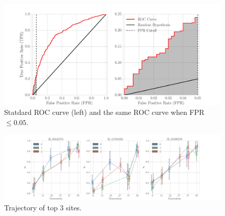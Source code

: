 \documentclass[11pt]{article}
\begin{document}
\begin{figure}[H]
	\centering
	\includegraphics[trim=0.4in 0 .8in 0.02in , 
	clip,width=\textwidth]{figures/powerROC.pdf}
	\caption{Statdard ROC curve (left) and the same ROC curve when FPR$\le 
		0.05$.} \label{fig:powerROC}
\end{figure}
\begin{figure}[H]
	\centering
	\includegraphics[width=\textwidth]{figures/trajectoryReal.pdf}
	\caption{Trajectory of top 3 sites.} 
	\label{fig:trajectoryReal}
\end{figure}
\end{document}
